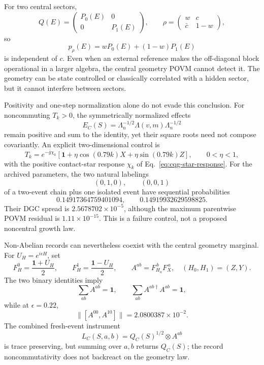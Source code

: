 For two central sectors,
\[
 Q(E)=
 \begin{pmatrix}P_0(E)&0\\0&P_1(E)\end{pmatrix},\qquad
 \rho=
 \begin{pmatrix}w&c\\\bar c&1-w\end{pmatrix},
\]
so
\begin{equation}
 p_\rho(E)=wP_0(E)+(1-w)P_1(E)
 \label{eq:ocg-coherence-blind}
\end{equation}
is independent of \(c\).  Even when an external reference makes the
off-diagonal block operational in a larger algebra, the central geometry
POVM cannot detect it.  The geometry can be state controlled or classically
correlated with a hidden sector, but it cannot interfere between sectors.

Positivity and one-step normalization alone do not evade this conclusion.
For noncommuting \(T_k>0\), the symmetrically normalized effects
\begin{equation}
 E_C(S)=
 \Lambda_n^{-1/2}\Lambda(v,m)\Lambda_n^{-1/2}
 \label{eq:ocg-noncentral-effect}
\end{equation}
remain positive and sum to the identity, yet their square roots need not
compose covariantly.  An explicit two-dimensional control is
\begin{equation}
 T_k=e^{-\bar g\chi_k}
 \left[
 \mathbf1+\eta\cos(0.79k)X+\eta\sin(0.79k)Z
 \right],
 \qquad 0<\eta<1 ,
 \label{eq:ocg-noncentral-coupling}
\end{equation}
with the positive contact-star response \(\chi_k\) of
Eq.~\eqref{eq:cqg-star-response}.  For the archived parameters, the two
natural labelings
\[
 (0,1,0),\qquad (0,0,1)
\]
of a two-event chain plus one isolated event have sequential probabilities
\[
 0.14917364759401094,\qquad
 0.14919932629598825.
\]
Their DGC spread is \(2.5678702\times10^{-5}\), although the maximum
parentwise POVM residual is \(1.11\times10^{-15}\).  This is a failure
control, not a proposed noncentral growth law.

Non-Abelian records can nevertheless coexist with the central geometry
marginal.  For \(U_H=e^{i\epsilon H}\), set
\[
 F_H^0=\frac{\mathbf1+U_H}{2},\qquad
 F_H^1=\frac{\mathbf1-U_H}{2},\qquad
 A^{ab}=F_{H_a}^{\,b}F_X^{\,a},
 \quad(H_0,H_1)=(Z,Y).
\]
The two binary identities imply
\[
 \sum_{ab}A^{ab}=\mathbf1,\qquad
 \sum_{ab}A^{ab\dagger}A^{ab}=\mathbf1,
\]
while at \(\epsilon=0.22\),
\[
 \|[A^{00},A^{10}]\|=2.0800387\times10^{-2}.
\]
The combined fresh-event instrument
\begin{equation}
 L_C(S,a,b)=Q_C(S)^{1/2}\otimes A^{ab}
 \label{eq:ocg-combined-instrument}
\end{equation}
is trace preserving, but summing over \(a,b\) returns \(Q_C(S)\); the
record noncommutativity does not backreact on the geometry law.

